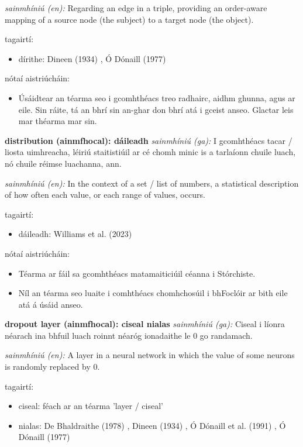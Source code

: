 \documentclass{article}
\begin{document}
\textit{sainmhíniú (en):} Regarding an edge in a triple, providing an order-aware mapping of a source node (the subject) to a target node (the object).

tagairtí:
\begin{itemize}
	\item dírithe: Dineen (1934) \cite{dineen}, Ó Dónaill (1977) \cite{odonaill}
\end{itemize}

nótaí aistriúcháin:
\begin{itemize}
	\item Úsáidtear an téarma seo i gcomhthéacs treo radhairc, aidhm ghunna, agus ar eile. Sin ráite, tá an bhrí sin an-ghar don bhrí atá i gceist anseo. Glactar leis mar théarma mar sin.
\end{itemize}


\textbf{distribution (ainmfhocal): dáileadh}
\textit{sainmhíniú (ga):} I gcomhthéacs tacar / liosta uimhreacha, léiriú staitistiúil ar cé chomh minic is a tarlaíonn chuile luach, nó chuile réimse luachanna, ann.

\textit{sainmhíniú (en):} In the context of a set / list of numbers, a statistical description of how often each value, or each range of values, occurs.

tagairtí:
\begin{itemize}
	\item dáileadh: Williams et al. (2023) \cite{storchiste}
\end{itemize}

nótaí aistriúcháin:
\begin{itemize}
	\item Téarma ar fáil sa gcomhthéacs matamaiticiúil céanna i Stórchiste.
	\item Níl an téarma seo luaite i comhthéacs chomhchosúil i bhFoclóir ar bith eile atá á úsáid anseo.
\end{itemize}


\textbf{dropout layer (ainmfhocal): ciseal nialas}
\textit{sainmhíniú (ga):} Ciseal i líonra néarach ina bhfuil luach roinnt néaróg ionadaithe le 0 go randamach.

\textit{sainmhíniú (en):} A layer in a neural network in which the value of some neurons is randomly replaced by 0.

tagairtí:
\begin{itemize}
	\item ciseal: féach ar an téarma 'layer / ciseal'
	\item nialas: De Bhaldraithe (1978) \cite{de-bhaldraithe}, Dineen (1934) \cite{dineen}, Ó Dónaill et al. (1991) \cite{focloir-beag}, Ó Dónaill (1977) \cite{odonaill}
\end{itemize}
\end{document}
